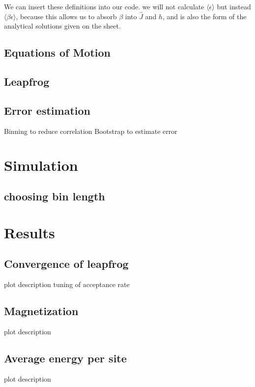 \documentclass{scrartcl}
\begin{document}
We can insert these definitions into our code. we will not calculate $\langle \epsilon\rangle$ but instead $\langle \beta\epsilon\rangle$, because this allows us to absorb $\beta$ into $\hat{J}$ and $h$, and is also the form of the analytical solutions given on the sheet.



\subsection{Equations of Motion}

\subsection{Leapfrog}

\subsection{Error estimation}
Binning to reduce correlation
Bootstrap to estimate error

\section{Simulation}

\subsection{choosing bin length}

\section{Results}

\subsection{Convergence of leapfrog}
plot description tuning of acceptance rate
\subsection{Magnetization}
plot description
\subsection{Average energy per site}
plot description

\newpage	
\listoffigures
\printbibliography
\end{document}
